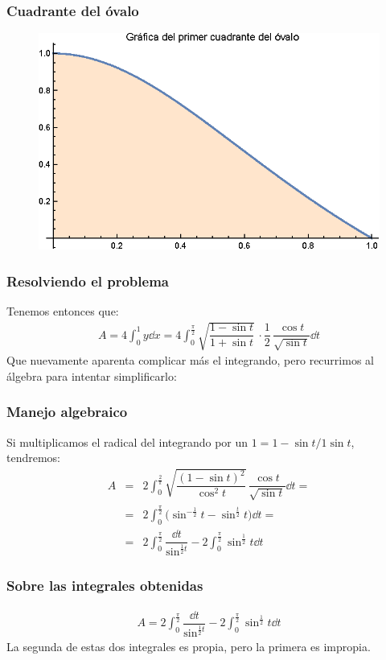 \begin{frame}
\frametitle{Cuadrante del óvalo}
\begin{figure}
    \centering
    \includegraphics[scale=1]{Imagenes/Asesoria_03_03.eps}
\end{figure}
\end{frame}
\begin{frame}
\frametitle{Resolviendo el problema}
Tenemos entonces que:
\begin{align*}
A = 4 \int_{0}^{1} y \dd{x} =  4 \int_{0}^{\frac{\pi}{2}} \sqrt{{\dfrac{1 - \sin t}{1 + \sin t}}} \, \cdot \dfrac{1}{2} \, \dfrac{\cos t}{\sqrt{\sin t}} \dd{t}
\end{align*}
\pause
Que nuevamente aparenta complicar más el integrando, pero recurrimos al álgebra para intentar simplificarlo:
\end{frame}
\begin{frame}
\frametitle{Manejo algebraico}
Si multiplicamos el radical del integrando por un $1 = 1 - \sin t / 1 \sin t$, tendremos:
\begin{eqnarray*}
A &=& 2 \int_{0}^{\frac{2}{\pi}} \sqrt{\dfrac{(1 - \sin t)^{2}}{\cos^{2} t}} \, \dfrac{\cos t}{\sqrt{\sin t}} \dd{t} = \\[1em]
&=& 2 \int_{0}^{\frac{\pi}{2}} \big( \sin^{-\frac{1}{2}} t - \sin^{\frac{t}{2}} t \big) \dd{t} = \\[1em]
&=& 2 \int_{0}^{\frac{\pi}{2}} \dfrac{\dd{t}}{\sin^{\frac{1}{2} t}} - 2 \int_{0}^{\frac{\pi}{2}} \sin^{\frac{1}{2}} t \dd{t}
\end{eqnarray*}
\end{frame}
\begin{frame}
\frametitle{Sobre las integrales obtenidas}
\begin{align*}
A = 2 \int_{0}^{\frac{\pi}{2}} \dfrac{\dd{t}}{\sin^{\frac{1}{2} t}} - 2 \int_{0}^{\frac{\pi}{2}} \sin^{\frac{1}{2}} t \dd{t}
\end{align*}
La segunda de estas dos integrales es propia, pero la primera es impropia.
\end{frame}
